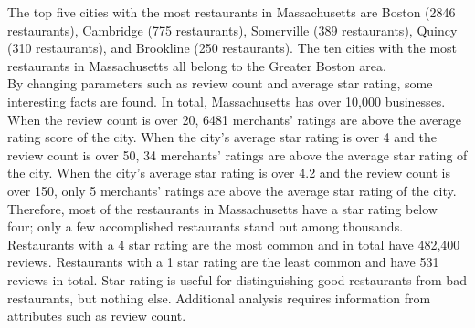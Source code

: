 \documentclass[11pt,journal,compsoc]{IEEEtran}
\begin{document}
\indent The top five cities with the most restaurants in Massachusetts are Boston (2846 restaurants), Cambridge (775 restaurants), Somerville (389 restaurants), Quincy (310 restaurants), and Brookline (250 restaurants). The ten cities with the most restaurants in Massachusetts all belong to the Greater Boston area.\\
\indent By changing parameters such as review count and average star rating, some interesting facts are found. In total, Massachusetts has over 10,000 businesses. When the review count is over 20, 6481 merchants’ ratings are above the average rating score of the city. When the city's average star rating is over 4 and the review count is over 50, 34 merchants’ ratings are above the average star rating of the city. When the city's average star rating is over 4.2 and the review count is over 150, only 5 merchants’ ratings are above the average star rating of the city. Therefore, most of the restaurants in Massachusetts have a star rating below four; only a few accomplished restaurants stand out among thousands. \\
\indent Restaurants with a 4 star rating are the most common and in total have 482,400 reviews. Restaurants with a 1 star rating are the least common and have 531 reviews in total. Star rating is useful for distinguishing good restaurants from bad restaurants, but nothing else. Additional analysis requires information from attributes such as review count. 
\end{document}

